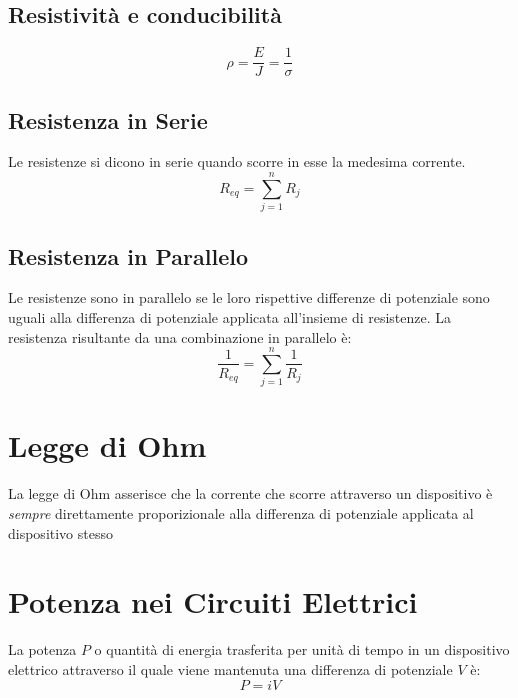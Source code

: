         \subsection{Resistività e conducibilità}
            \begin{equation}
                \rho = \frac{E}{J} = \frac{1}{\sigma}
            \end{equation}

        \subsection{Resistenza in Serie} Le resistenze si dicono in serie
        quando scorre in esse la medesima corrente.
            \begin{equation}
                R_{eq} = \sum_{j=1}^{n} R_j
            \end{equation}

        \subsection{Resistenza in Parallelo} Le resistenze sono in parallelo se
        le loro rispettive differenze di potenziale sono uguali alla differenza
        di potenziale applicata all'insieme di resistenze. La resistenza 
        risultante da una combinazione in parallelo è:
            \begin{equation}
                \frac{1}{R_{eq}} = \sum_{j = 1}^{n} \frac{1}{R_j}
            \end{equation}


    \section{Legge di Ohm} La legge di Ohm asserisce che la corrente che scorre
    attraverso un dispositivo è \textit{sempre} direttamente proporizionale 
    alla differenza di potenziale applicata al dispositivo stesso

    \section{Potenza nei Circuiti Elettrici} La potenza $P$ o quantità di 
    energia trasferita per unità di tempo in un dispositivo elettrico 
    attraverso il quale viene mantenuta una differenza di potenziale $V$ è:
            \begin{equation}
                P = iV
            \end{equation}

